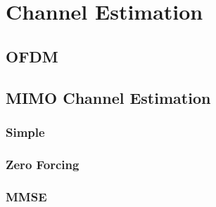 \chapter{Channel Estimation}
\label{ch:ChEst}

\section{OFDM}\label{sec:OFDM}
\section{MIMO Channel Estimation}\label{sec:MIMO}

\subsection{Simple}\label{ssec:Simple}
\subsection{Zero Forcing}\label{ssec:ZF}
\subsection{MMSE}\label{ssec:MMSE}

